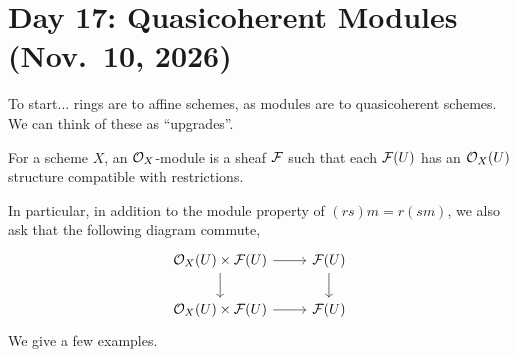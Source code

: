 \section{Day 17: Quasicoherent Modules (Nov.\ 10, 2026)}
To start... rings are to affine schemes, as modules are to quasicoherent schemes. We can think of these as ``upgrades''.

\begin{definition} \label{defn:O_X-module}
    For a scheme $X$, an $\mathcal O_X$-module is a sheaf $\mathcal F$ such that each $\mathcal F(U)$ has an $\mathcal O_X(U)$ structure compatible with restrictions.
\end{definition}
In particular, in addition to the module property of $(rs)m = r(sm)$, we also ask that the following diagram commute,
\[
    \begin{tikzcd}
        \SO_X(U)  \times \SF(U) \arrow[r] \arrow[d] & \SF(U) \arrow[d] \\ \SO_X(U) \times \SF(U) \arrow[r] & \SF(U)
    \end{tikzcd}
\]
We give a few examples.
